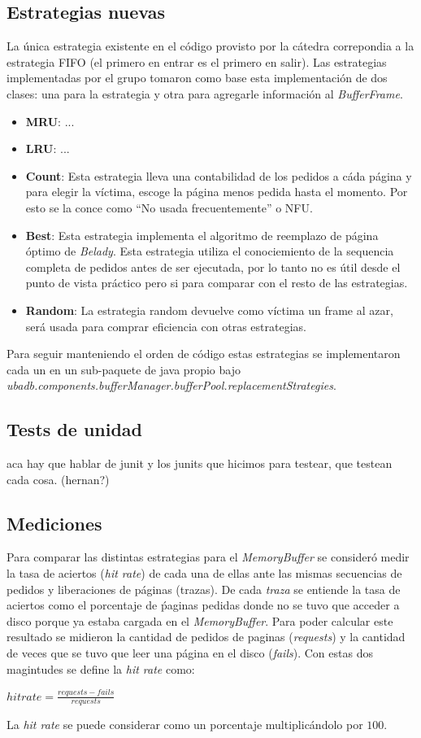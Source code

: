 \subsection{Estrategias nuevas}
La \'unica estrategia existente en el c\'odigo provisto por la c\'atedra correpondia a la estrategia FIFO 
(el primero en entrar es el primero en salir). Las estrategias implementadas por el grupo tomaron como base esta
implementaci\'on de dos clases: una para la estrategia y otra para agregarle informaci\'on al \textit{BufferFrame}.
\begin{itemize}
\item \textbf{MRU}: ... 
\item \textbf{LRU}: ...
\item \textbf{Count}: Esta estrategia lleva una contabilidad de los pedidos a c\'ada p\'agina y para elegir la v\'ictima, escoge 
la p\'agina menos pedida hasta el momento. Por esto se la conce como ``No usada frecuentemente'' o NFU.
\item \textbf{Best}: Esta estrategia implementa el algoritmo de reemplazo de p\'agina \'optimo de \textit{Belady}. Esta estrategia 
utiliza el conociemiento de la sequencia completa de pedidos antes de ser ejecutada, por lo tanto no es \'util desde el punto de vista pr\'actico
pero si para comparar con el resto de las estrategias.  
\item \textbf{Random}: La estrategia random devuelve como v\'ictima un frame al azar, ser\'a usada para 
comprar eficiencia con otras estrategias.
\end{itemize}
Para seguir manteniendo el orden de c\'odigo estas estrategias se implementaron cada un en un sub-paquete de java propio 
bajo \textit{ubadb.components.bufferManager.bufferPool.replacementStrategies}.

\subsection{Tests de unidad}
aca hay que hablar de junit y los junits que hicimos para testear, que testean cada cosa.
(hernan?)

\subsection{Mediciones}
Para comparar las distintas estrategias para el \textit{MemoryBuffer} se consider\'o medir
la tasa de aciertos (\textit{hit rate}) de cada una de ellas ante las mismas secuencias 
de pedidos y liberaciones de p\'aginas (trazas). De cada \textit{traza} se entiende la tasa
de aciertos como el porcentaje de \'paginas pedidas donde no se tuvo que acceder a disco
porque ya estaba cargada en el \textit{MemoryBuffer}. Para poder calcular este resultado
se midieron la cantidad de pedidos de paginas (\textit{requests}) y la cantidad de veces
que se tuvo que leer una p\'agina en el disco (\textit{fails}). Con estas dos magintudes
se define la \textit{hit rate} como: \\
\begin{center}
$hit rate = \frac{requests-fails}{requests}$  
\end{center}
La \textit{hit rate} se puede considerar como un porcentaje multiplic\'andolo por $100$.

